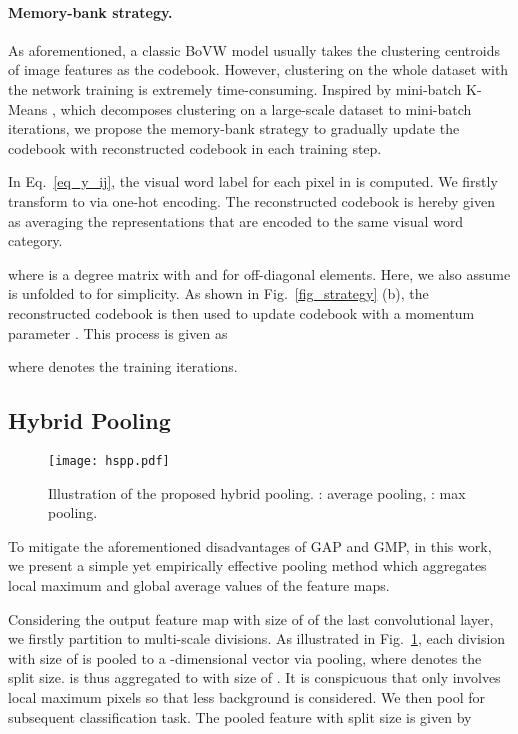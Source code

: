 \paragraph{\textbf{Memory-bank strategy.}}
\par As aforementioned, a classic BoVW model usually takes the clustering centroids of image features as the codebook. However, clustering on the whole dataset with the network training is extremely time-consuming. Inspired by mini-batch K-Means \citep{sculley2010web}, which decomposes clustering on a large-scale dataset to mini-batch iterations, we propose the {memory-bank strategy} to gradually update the codebook with reconstructed codebook in each training step.
\par In Eq.~\eqref{eq_y_ij}, the visual word label  for each pixel in  is computed. We firstly transform  to  via one-hot encoding. The reconstructed codebook  is hereby given as averaging the representations that are encoded to the same visual word category.

where  is a degree matrix with  and  for off-diagonal elements. Here, we also assume  is unfolded to  for simplicity. As shown in Fig.~\ref{fig_strategy} (b), the reconstructed codebook  is then used to update codebook with a momentum parameter . This process is given as

where  denotes the training iterations.

\subsection{Hybrid Pooling}
\begin{figure}[htbp]
  \centering
  \texttt{[image: hspp.pdf]}
  \caption{Illustration of the proposed hybrid pooling. : average pooling, : max pooling.}
  \label{fig_hp}
\end{figure}
\par To mitigate the aforementioned disadvantages of GAP and GMP, in this work, we present a simple yet empirically effective pooling method which aggregates local maximum and global average values of the feature maps.

\par Considering the output feature map  with size of  of the last convolutional layer, we firstly partition  to multi-scale divisions. As illustrated in Fig.~\ref{fig_hp}, each division with size of  is pooled to a -dimensional vector via  pooling, where  denotes the split size.  is thus aggregated to  with size of . It is conspicuous that  only involves local maximum pixels so that less background is considered. We then pool  for subsequent classification task. The pooled feature  with split size  is given by


